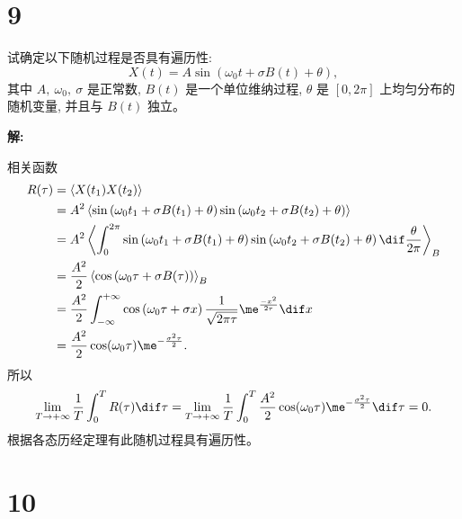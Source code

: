 \documentclass[12pt,a4]{ctexart}
\begin{document}
\section{9}


试确定以下随机过程是否具有遍历性:
\begin{equation}
	X(t)=A \sin \left(\omega_{0} t+\sigma B(t)+\theta \right),
\end{equation}
其中 $A,\ \omega_{0},\ \sigma$ 是正常数, $B(t)$ 是一个单位维纳过程, $\theta$ 是 $[0,2 \pi]$ 上均匀分布的随机变量, 并且与 $B(t)$ 独立。

\textsf{\hspace{-2em}\sf  \textbf{解:}}

相关函数
\begin{equation}
	\begin{aligned}
		R(\tau) & = \left\langle X(t_1) X(t_2) \right\rangle                                                                                                                                                  \\
				& = A^2 \left\langle \sin \left(\omega_{0} t_1 + \sigma B(t_1)+\theta \right) \sin \left(\omega_{0} t_2 + \sigma B(t_2)+\theta \right) \right\rangle                                          \\
				& = A^2 \left\langle \int_0^{2\pi} \sin \left(\omega_{0} t_1 + \sigma B(t_1)+\theta \right) \sin \left(\omega_{0} t_2 + \sigma B(t_2)+\theta \right) \dif \frac{\theta}{2\pi} \right\rangle_B \\
				& = \frac{A^2}{2}\left\langle  \cos \left(\omega_{0} \tau + \sigma B(\tau) \right) \right\rangle_B                                                                                            \\
				& = \frac{A^2}{2}\int^{+\infty}_{-\infty}  \cos \left(\omega_{0} \tau + \sigma x \right) \frac{1}{\sqrt{2\pi \tau}} \me^{\frac{-x^2}{2\tau}} \dif x                                           \\
				& = \frac{A^2}{2}\cos(\omega_0 \tau) \me^{-\frac{\sigma^2\tau}{2}}.
	\end{aligned}
\end{equation}
所以
\begin{equation}
	\lim_{T \to +\infty} \frac{1}{T} \int^T_0 R(\tau) \dif \tau = \lim_{T \to +\infty} \frac{1}{T} \int^T_0 \frac{A^2}{2}\cos(\omega_0 \tau) \me^{-\frac{\sigma^2\tau}{2}} \dif \tau = 0.
\end{equation}
根据各态历经定理有此随机过程具有遍历性。


\section{10}
\end{document}
